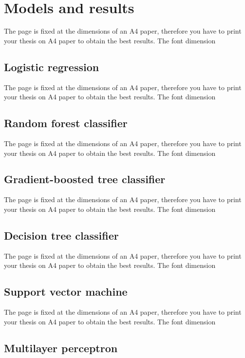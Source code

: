 \documentclass[LaM,binding=0.6cm, english]{sapthesis}
\begin{document}
\chapter{Models and results}

The page is fixed at the dimensions of an A4 paper, therefore you have to print your thesis on A4 paper to obtain the best results. The font dimension

\section{Logistic regression}

The page is fixed at the dimensions of an A4 paper, therefore you have to print your thesis on A4 paper to obtain the best results. The font dimension

\section{Random forest classifier}

The page is fixed at the dimensions of an A4 paper, therefore you have to print your thesis on A4 paper to obtain the best results. The font dimension

\section{Gradient-boosted tree classifier}

The page is fixed at the dimensions of an A4 paper, therefore you have to print your thesis on A4 paper to obtain the best results. The font dimension

\section{Decision tree classifier}

The page is fixed at the dimensions of an A4 paper, therefore you have to print your thesis on A4 paper to obtain the best results. The font dimension

\section{Support vector machine}

The page is fixed at the dimensions of an A4 paper, therefore you have to print your thesis on A4 paper to obtain the best results. The font dimension

\section{Multilayer perceptron}
\end{document}
